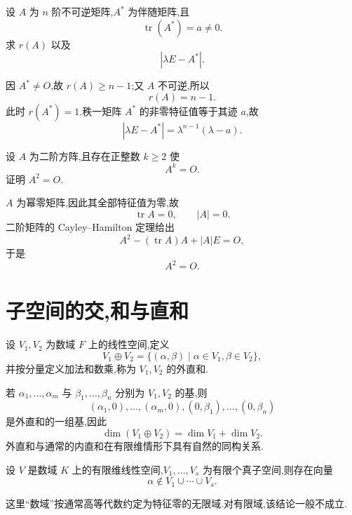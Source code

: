 \begin{example}
设 $A$ 为 $n$ 阶不可逆矩阵,$A^*$ 为伴随矩阵,且
\[
 \operatorname{tr}(A^*)=a\neq0.
\]
求 $r(A)$ 以及
\[
 |\lambda E-A^*|.
\]
\end{example}
\exampleblank

\begin{solution}
因 $A^*\neq O$,故 $r(A)\geq n-1$;又 $A$ 不可逆,所以
\[
 \boxed{r(A)=n-1}.
\]
此时 $r(A^*)=1$.秩一矩阵 $A^*$ 的非零特征值等于其迹 $a$,故
\[
 \boxed{|\lambda E-A^*|=\lambda^{n-1}(\lambda-a)}.
\]
\end{solution}

\begin{example}
设 $A$ 为二阶方阵,且存在正整数 $k\geq2$ 使
\[
 A^k=O.
\]
证明 $A^2=O$.
\end{example}
\exampleblank

\begin{solution}
$A$ 为幂零矩阵,因此其全部特征值为零,故
\[
 \operatorname{tr}A=0,\qquad |A|=0.
\]
二阶矩阵的 Cayley--Hamilton 定理给出
\[
 A^2-(\operatorname{tr}A)A+|A|E=O,
\]
于是
\[
 \boxed{A^2=O}.
\]
\end{solution}


\newpage

\section{子空间的交,和与直和}

\begin{definition}
设 $V_1,V_2$ 为数域 $F$ 上的线性空间,定义
\[
V_1\oplus V_2
=
\{(\alpha,\beta)\mid \alpha\in V_1,\beta\in V_2\},
\]
并按分量定义加法和数乘,称为 $V_1,V_2$ 的外直和.
\end{definition}

若 $\alpha_1,\ldots,\alpha_m$ 与 $\beta_1,\ldots,\beta_n$ 分别为 $V_1,V_2$ 的基,则
\[
(\alpha_1,0),\ldots,(\alpha_m,0),(0,\beta_1),\ldots,(0,\beta_n)
\]
是外直和的一组基,因此
\[
\dim(V_1\oplus V_2)=\dim V_1+\dim V_2.
\]
外直和与通常的内直和在有限维情形下具有自然的同构关系.

\begin{theorem}
设 $V$ 是数域 $K$ 上的有限维线性空间,$V_1,\ldots,V_s$ 为有限个真子空间,则存在向量
\[
\alpha\notin V_1\cup\cdots\cup V_s.
\]
\end{theorem}

\begin{remark}
这里``数域''按通常高等代数约定为特征零的无限域.对有限域,该结论一般不成立.
\end{remark}

